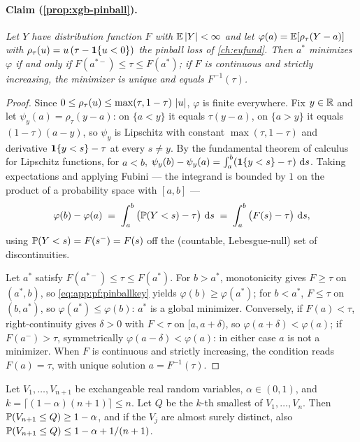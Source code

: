 \paragraph{Claim (\cref{prop:xgb-pinball}).}
\emph{Let $Y$ have distribution function $F$ with $\mathbb{E}\left|Y\right| < \infty$ and let $\varphi(a) =
\mathbb{E}[\rho_\tau(Y - a)]$ with $\rho_\tau(u) = u\,(\tau - \mathbf{1}\{u < 0\})$ the pinball loss of
\cref{ch:eufund}. Then $a^*$ minimizes $\varphi$ if and only if $F(a^{*-}) \le \tau \le F(a^*)$; if $F$
is continuous and strictly increasing, the minimizer is unique and equals $F^{-1}(\tau)$.}
\begin{proof}
Since $0 \le \rho_\tau(u) \le \max(\tau, 1-\tau)\,\left|u\right|$, $\varphi$ is finite everywhere. Fix $y \in
\mathbb{R}$ and let $\psi_y(a) = \rho_\tau(y - a)$: on $\{a < y\}$ it equals $\tau(y-a)$, on $\{a > y\}$ it
equals $(1-\tau)(a-y)$, so $\psi_y$ is Lipschitz with constant $\max(\tau, 1-\tau)$ and derivative
$\mathbf{1}\{y < s\} - \tau$ at every $s \ne y$. By the fundamental theorem of calculus for Lipschitz
functions, for $a < b$, $\psi_y(b) - \psi_y(a) = \int_a^b (\mathbf{1}\{y < s\} - \tau)\, \,\mathrm{d} s$. Taking
expectations and applying Fubini --- the integrand is bounded by $1$ on the product of a probability
space with $[a,b]$ ---
\begin{equation}
\label{eq:app:pf:pinballkey}
\varphi(b) - \varphi(a) \;=\; \int_a^b \big( \mathbb{P}(Y < s) - \tau \big)\, \,\mathrm{d} s
\;=\; \int_a^b \big( F(s) - \tau \big)\, \,\mathrm{d} s ,
\end{equation}
using $\mathbb{P}(Y < s) = F(s^-) = F(s)$ off the (countable, Lebesgue-null) set of discontinuities.

Let $a^*$ satisfy $F(a^{*-}) \le \tau \le F(a^*)$. For $b > a^*$, monotonicity gives $F \ge \tau$ on
$(a^*, b)$, so \cref{eq:app:pf:pinballkey} yields $\varphi(b) \ge \varphi(a^*)$; for $b < a^*$, $F \le
\tau$ on $(b, a^*)$, so $\varphi(a^*) \le \varphi(b)$: $a^*$ is a global minimizer. Conversely, if
$F(a) < \tau$, right-continuity gives $\delta > 0$ with $F < \tau$ on $[a, a+\delta)$, so $\varphi(a +
\delta) < \varphi(a)$; if $F(a^-) > \tau$, symmetrically $\varphi(a - \delta) < \varphi(a)$: in either
case $a$ is not a minimizer. When $F$ is continuous and strictly increasing, the condition reads
$F(a) = \tau$, with unique solution $a = F^{-1}(\tau)$.
\end{proof}
\begin{lemma}
\label{app:pf:rank}
Let $V_1, \dots, V_{n+1}$ be exchangeable real random variables, $\alpha \in (0,1)$, and $k = \lceil
(1-\alpha)(n+1) \rceil \le n$. Let $Q$ be the $k$-th smallest of $V_1, \dots, V_n$. Then
$\mathbb{P}(V_{n+1} \le Q) \ge 1 - \alpha$, and if the $V_j$ are almost surely distinct, also
$\mathbb{P}(V_{n+1} \le Q) \le 1 - \alpha + 1/(n+1)$.
\end{lemma}
